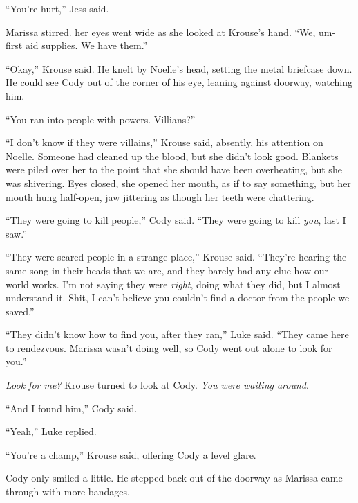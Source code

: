 ``You're hurt,'' Jess said.



Marissa stirred.  her eyes went wide as she looked at Krouse's hand.  ``We, um- first aid supplies.  We have them.''



``Okay,'' Krouse said.  He knelt by Noelle's head, setting the metal briefcase down.  He could see Cody out of the corner of his eye, leaning against doorway, watching him.



``You ran into people with powers.  Villians?''



``I don't know if they were villains,'' Krouse said, absently, his attention on Noelle.  Someone had cleaned up the blood, but she didn't look good.  Blankets were piled over her to the point that she should have been overheating, but she was shivering.  Eyes closed, she opened her mouth, as if to say something, but her mouth hung half-open, jaw jittering as though her teeth were chattering.



``They were going to kill people,'' Cody said.  ``They were going to kill \emph{you}, last I saw.''



``They were scared people in a strange place,'' Krouse said.  ``They're hearing the same song in their heads that we are, and they barely had any clue how our world works.  I'm not saying they were \emph{right}, doing what they did, but I almost understand it.  Shit, I can't believe you couldn't find a doctor from the people we saved.''



``They didn't know how to find you, after they ran,'' Luke said.  ``They came here to rendezvous.  Marissa wasn't doing well, so Cody went out alone to look for you.''



\emph{Look for me?}  Krouse turned to look at Cody.  \emph{You were waiting around}.



``And I found him,'' Cody said.



``Yeah,'' Luke replied.



``You're a champ,'' Krouse said, offering Cody a level glare.



Cody only smiled a little.  He stepped back out of the doorway as Marissa came through with more bandages.



